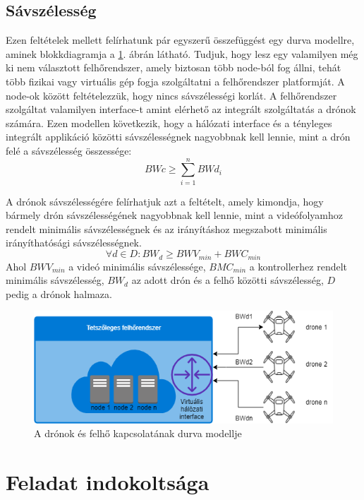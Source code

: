 \subsection{Sávszélesség}
\noindent
Ezen feltételek mellett felírhatunk pár egyszerű összefüggést egy durva modellre, aminek blokkdiagramja a \ref{fig:dronecommunicationtocloud}. ábrán látható. Tudjuk, hogy lesz egy valamilyen még ki nem választott felhőrendszer, amely biztosan több node-ból fog állni, tehát több fizikai vagy virtuális gép fogja szolgáltatni a felhőrendszer platformját. A node-ok között feltételezzük, hogy nincs sávszélességi korlát. A felhőrendszer szolgáltat valamilyen interface-t amint elérhető az integrált szolgáltatás a drónok számára. Ezen modellen következik, hogy a hálózati interface és a tényleges integrált applikáció közötti sávszélességnek nagyobbnak kell lennie, mint a drón felé a sávszélesség összessége:
\[
BWc \geq \sum_{i=1}^{n}{BWd_i}
\]

A drónok sávszélességére felírhatjuk azt a feltételt, amely kimondja, hogy bármely drón sávszélességének nagyobbnak kell lennie, mint a videófolyamhoz rendelt minimális sávszélességnek és az irányításhoz megszabott minimális irányíthatósági sávszélességnek.
\[
\forall d \in D: BW_d \geq BWV_{min} + BWC_{min}
\]
Ahol $BWV_{min}$ a videó minimális sávszélessége, $BMC_{min}$ a kontrollerhez rendelt minimális sávszélesség, $BW_d$ az adott drón és a felhő közötti sávszélesség, $D$ pedig a drónok halmaza.

\begin{figure}
	\centering
	\includegraphics[width=\linewidth]{figures/drone_communication_to_cloud.png}
	\caption{A drónok és felhő kapcsolatának durva modellje}
	\label{fig:dronecommunicationtocloud}
\end{figure}

\section{Feladat indokoltsága}
